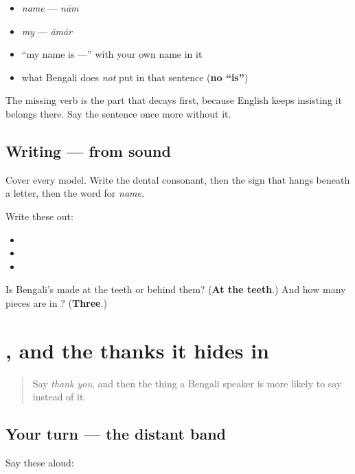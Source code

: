 \begin{itemize}
\raggedright
  \item \emph{name} — \emph{nām}
  \item \emph{my} — \emph{āmār}
  \item \textquotedblleft{}my name is —\textquotedblright{} with your own name in it
  \item what Bengali does \emph{not} put in that sentence (\textbf{no \textquotedblleft{}is\textquotedblright{}})
\end{itemize}

The missing verb is the part that decays first, because English keeps insisting it belongs there. Say the sentence once more without it.

\subsection*{Writing — from sound}
Cover every model. Write the dental consonant, then the sign that hangs beneath a letter, then the word for \emph{name}.

Write these out:

\begin{itemize}
\raggedright
  \item {}
  \item {}
  \item {}
\end{itemize}

\begin{tcolorbox}[breakable,colback=teal!4,colframe=teal!35!black,title={Before you move on}]
Is Bengali's \textbf{} made at the teeth or behind them? (\textbf{At the teeth}.) And how many pieces are in \textbf{}? (\textbf{Three}.)
\end{tcolorbox}
\section[Practice]{, and the thanks it hides in}

\label{lesson:BN-R01-ya-again}



\begin{quote}
Say \emph{thank you}, and then the thing a Bengali speaker is more likely to say instead of it.
\end{quote}

\subsection*{Your turn — the distant band}
Say these aloud:

